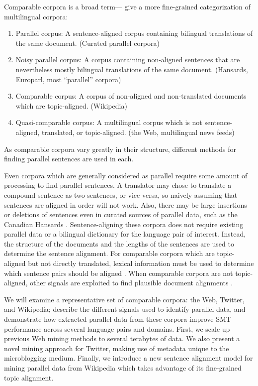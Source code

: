 Comparable corpora is a broad term---\citet{Fung04a} give a more
fine-grained categorization of multilingual corpora:
\begin{enumerate}
\item Parallel corpus: A sentence-aligned corpus containing bilingual
translations of the same document. (Curated parallel corpora)
\item Noisy parallel corpus: A corpus containing non-aligned sentences that are
nevertheless mostly bilingual translations of the same document. (Hansards,
Europarl, most ``parallel'' corpora)
\item Comparable corpus: A corpus of non-aligned and non-translated documents
which are topic-aligned. (Wikipedia)
\item Quasi-comparable corpus: A multilingual corpus which is not
sentence-aligned, translated, or topic-aligned. (the Web, multilingual news feeds)
\end{enumerate}
As comparable corpora vary greatly in their structure, different methods for finding
parallel sentences are used in each.

Even corpora which are generally considered as parallel require some amount of
processing to find parallel sentences. 
A translator may chose to translate a compound sentence as two sentences, or
vice-versa, so naively assuming that sentences are aligned in order will not
work.
Also, there may be large insertions or deletions of sentences even in curated
sources of parallel data, such as the Canadian Hansards \citep{Gale93,Chen93}.
Sentence-aligning these corpora does not require existing parallel data or a
bilingual dictionary for the language pair of interest. Instead, the structure
of the documents and the lengths of the sentences are used to determine the
sentence alignment. For comparable corpora which are topic-aligned but not
directly translated, lexical information must be used to determine which
sentence pairs should be aligned \citep{Munteanu05}. When comparable corpora are
not topic-aligned, other signals are exploited to find plausible document
alignments \citep{Resnik03}.

We will examine a representative set of comparable corpora: the Web, Twitter,
and Wikipedia; describe the different signals used to identify parallel data,
and demonstrate how extracted parallel data from these corpora improve SMT
performance across several language pairs and domains. First, we scale up
previous Web mining methods \citep{Resnik03} to several terabytes of data. We
also present a novel mining approach for Twitter, making use of metadata unique
to the microblogging medium. Finally, we introduce a new sentence alignment
model for mining parallel data from Wikipedia which takes advantage of its
fine-grained topic alignment.

